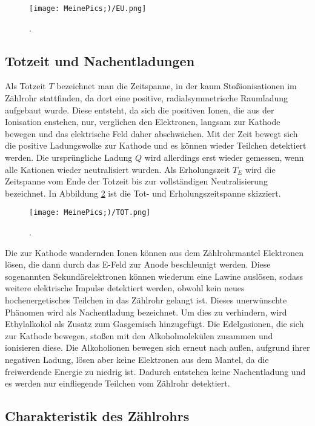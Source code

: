 \begin{figure}
  \centering
  \texttt{[image: MeinePics;)/EU.png]}
  \caption{.\cite{anleitung}}
  \label{fig:EU}
\end{figure}

\FloatBarrier

\subsection{Totzeit und Nachentladungen}

Als Totzeit $T$ bezeichnet man die Zeitspanne, in der kaum Stoßionisationen im
Zählrohr stattfinden, da dort eine positive, radialsymmetrische Raumladung
aufgebaut wurde. Diese entsteht, da sich die positiven Ionen,
die aus der Ionisation enstehen, nur, verglichen den Elektronen, langsam
zur Kathode bewegen und das elektrische Feld daher abschwächen.
Mit der Zeit bewegt sich die positive Ladungswolke zur Kathode und
es können wieder Teilchen detektiert werden.
Die ursprüngliche Ladung $Q$ wird allerdings erst wieder gemessen, wenn alle
Kationen wieder neutralisiert wurden. Als Erholungszeit $T_E$ wird die
Zeitspanne vom Ende der Totzeit bis zur vollständigen Neutralisierung
bezeichnet.
In Abbildung \ref{fig:TOT} ist die Tot- und Erholungszeitspanne skizziert.

\begin{figure}
  \centering
  \texttt{[image: MeinePics;)/TOT.png]}
  \caption{.\cite{anleitung}}
  \label{fig:TOT}
\end{figure}

Die zur Kathode wandernden Ionen können aus dem Zählrohrmantel Elektronen lösen,
die dann durch das E-Feld zur Anode beschleunigt werden. Diese sogenannten
Sekundärelektronen können wiederum eine Lawine auslösen, sodass weitere
elektrische Impulse detektiert werden, obwohl kein neues hochenergetisches
Teilchen in das Zählrohr gelangt ist. Dieses unerwünschte Phänomen
wird als Nachentladung bezeichnet. Um dies zu verhindern, wird
Ethylalkohol als Zusatz zum Gasgemisch hinzugefügt. Die Edelgasionen, die
sich zur Kathode bewegen, stoßen mit den Alkoholmolekülen zusammen und
ionisieren diese. Die Alkoholionen bewegen sich erneut nach außen, aufgrund
ihrer negativen Ladung, lösen aber keine Elektronen aus dem Mantel, da
die freiwerdende Energie zu niedrig ist. Dadurch entstehen keine Nachentladung
und es werden nur einfliegende Teilchen vom Zählrohr detektiert.

\subsection{Charakteristik des Zählrohrs}

